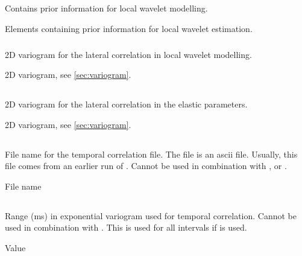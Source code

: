 \subsection{}
 \slist
   \item \Description Contains prior information for local wavelet modelling.
   \item \Argument Elements containing prior information for local wavelet estimation.
   \item \Default
 \elist

\subsubsection{}
 \slist
   \item \Description 2D variogram for the lateral correlation in local wavelet  modelling.
   \item \Argument 2D variogram, see \autoref{sec:variogram}.
   \item \Default
 \elist

\subsection{}
 \slist
   \item \Description 2D variogram for the lateral correlation in the elastic parameters.
   \item \Argument 2D variogram, see \autoref{sec:variogram}.
   \item \Default
 \elist

\subsection{}
 \slist
   \item \Description File name for the temporal correlation file. The file is an ascii file. Usually, this file comes from an earlier run of \crava. Cannot be used in combination with ,  or .
   \item \Argument File name
   \item \Default
 \elist

 \subsection{}
  \slist
    \item \Description Range (ms) in exponential variogram used for temporal correlation. Cannot be used in combination with . This is used for all intervals if  is used.
    \item \Argument Value
    \item \Default
 \elist

